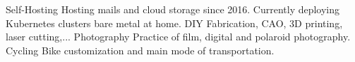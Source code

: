 \interest%
{Self-Hosting}%
{Hosting mails and cloud storage since 2016. Currently deploying Kubernetes
clusters bare metal at home.}%
{}%
\interest
{DIY}
{Fabrication, CAO, 3D printing, laser cutting,...}
{}
\interest%
{Photography}%
{Practice of film, digital and polaroid photography.}%
{}%
\interest%
{Cycling}%
{Bike customization and main mode of transportation.}%
{}%
